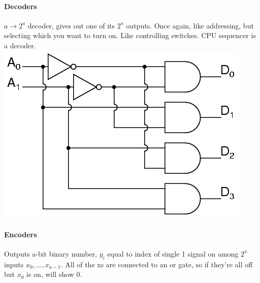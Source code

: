 \documentclass[12 pt]{article}
\begin{document}
	\paragraph{Decoders} $a \to 2^a$ decoder, gives out one of its $2^a$ outputs. Once again, like addressing, but selecting which you want to turn on. Like controlling switches. CPU sequencer is a decoder. \includegraphics[scale=0.5]{decd}
	\paragraph{Encoders} Outputs a-bit binary number, $y_i$ equal to index of single 1 signal on among $2^a$ inputs $x_0,\ldots,x_{a-1}$. All of the xs are connected to an or gate, so if they're all off but $x_0$ is on, will show $0$.
\end{document}
